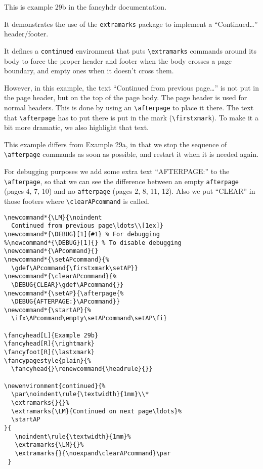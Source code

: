 \documentclass{report}
\newcommand*{\LM}{\noindent
  Continued from previous page\ldots\\[1ex]}
\newcommand*{\DEBUG}[1]{#1} %
\newcommand*{\APcommand}{}
\newcommand*{\setAPcommand}{%
  \gdef\APcommand{\firstxmark\setAP}}
\newcommand*{\clearAPcommand}{%
  \DEBUG{CLEAR}\gdef\APcommand{}}
\newcommand*{\setAP}{\afterpage{%
  \DEBUG{AFTERPAGE:}\APcommand}}
\newcommand*{\startAP}{%
  \ifx\APcommand\empty\setAPcommand\setAP\fi}
\begin{document}
\tableofcontents

\thispagestyle{plain}

\bigskip

\noindent
\begin{boxedminipage}{\textwidth}
This is example 29b in the fancyhdr documentation.

It demonstrates the use of the \texttt{extramarks} package to implement
a ``Continued\ldots'' header/footer.

It defines a \texttt{continued} environment that puts \verb|\extramarks| commands around its body to force the proper header and footer when the body crosses a page boundary, and empty ones when it doesn't cross them.

However, in this example, the text ``Continued from previous page\ldots'' is not put in the page header, but on the top of the page body. The page header is used for normal headers. This is done by using an \verb|\afterpage| to place it there. The text that \verb|\afterpage| has to put there is put in the mark (\verb|\firstxmark|). To make it a bit more dramatic, we also highlight that text.

This example differs from Example 29a, in that we stop the sequence of \verb|\afterpage| commands as soon as possible, and restart it when it is needed again.
\end{boxedminipage}

\noindent
\begin{boxedminipage}{\textwidth}
For debugging purposes we add some extra text ``AFTERPAGE:'' to the \verb|\afterpage|, so that we can see the difference between an empty \texttt{afterpage} (pages 4, 7, 10) and no \texttt{afterpage} (pages 2, 8, 11, 12). Also we put ``CLEAR'' in those footers where \verb|\clearAPcommand| is called.

\begin{verbatim}
\newcommand*{\LM}{\noindent
  Continued from previous page\ldots\\[1ex]}
\newcommand*{\DEBUG}[1]{#1} % For debugging
%\newcommand*{\DEBUG}[1]{} % To disable debugging
\newcommand*{\APcommand}{}
\newcommand*{\setAPcommand}{%
  \gdef\APcommand{\firstxmark\setAP}}
\newcommand*{\clearAPcommand}{%
  \DEBUG{CLEAR}\gdef\APcommand{}}
\newcommand*{\setAP}{\afterpage{%
  \DEBUG{AFTERPAGE:}\APcommand}}
\newcommand*{\startAP}{%
  \ifx\APcommand\empty\setAPcommand\setAP\fi}

\fancyhead[L]{Example 29b}
\fancyhead[R]{\rightmark}
\fancyfoot[R]{\lastxmark}
\fancypagestyle{plain}{%
  \fancyhead{}\renewcommand{\headrule}{}}

\newenvironment{continued}{%
  \par\noindent\rule{\textwidth}{1mm}\\*
  \extramarks{}{}%
  \extramarks{\LM}{Continued on next page\ldots}%
  \startAP
}{
   \noindent\rule{\textwidth}{1mm}%
   \extramarks{\LM}{}%
   \extramarks{}{\noexpand\clearAPcommand}\par
 }
\end{verbatim}

\end{boxedminipage}
\end{document}
